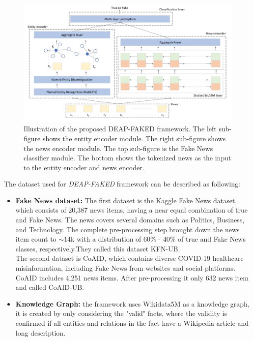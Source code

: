\documentclass[10pt, english]{report}
\begin{document}
\begin{figure}[H]
	\centering
	\includegraphics[scale=0.45]{img/deap_fake_framework.png}
	\caption{Illustration of the proposed DEAP-FAKED framework. The left sub-figure shows the entity encoder module. The right sub-figure shows the news encoder module. The top sub-figure is the Fake News classifier module. The bottom shows the tokenized news as the input to the entity encoder and news encoder. \cite{mayank2021deap}}
\end{figure}

The dataset used for \textit{DEAP-FAKED} framework can be described as following:

\begin{itemize}
\item \textbf{Fake News dataset:} The first dataset is the Kaggle Fake News dataset, which consists of 20,387 news items, having a near equal combination of true and Fake News. The news covers several domains such as Politics, Business, and Technology.
The complete pre-processing step brought down the news item count to  $\sim$14k with a distribution of 60\% - 40\% of true and Fake News classes, respectively.They called this dataset KFN-UB.\\
The second dataset is CoAID, which contains diverse COVID-19 healthcare misinformation, including Fake News from websites and social platforms. CoAID includes 4,251 news items. After pre-processing it only 632 news item and called CoAID-UB.
\item \textbf{Knowledge Graph:} the framework uses Wikidata5M as a knowledge graph, it is created by only considering the "valid" facts, where the validity is confirmed if all entities and relations in the fact have a Wikipedia article and long description.
\end{itemize}
\end{document}
